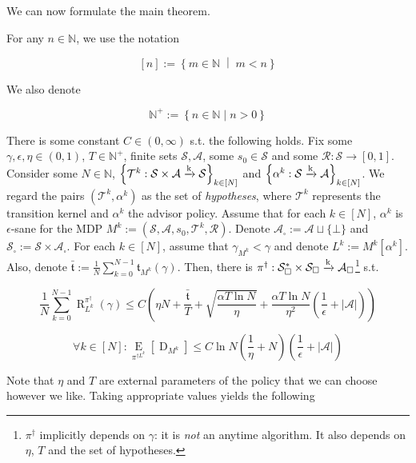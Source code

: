 \documentclass[anon,12pt]{colt2018} %
\newcommand{\AP}[1]{\left(#1\right)}
\newcommand{\AB}[1]{\left[#1\right]}
\newcommand{\AC}[1]{\left\{#1\right\}}
\newcommand{\ACM}[2]{\left\{#1\;\middle\vert\;#2\right\}}
\newcommand{\Ea}[2]{\underset{#1}{\operatorname{E}}\AB{#2}}
\newcommand{\Nats}{\mathbb{N}}
\newcommand{\Abs}[1]{\left\vert #1 \right\vert}
\newcommand{\K}{\xrightarrow{\textnormal{k}}}
\newcommand{\A}{\mathcal{A}}
\newcommand{\St}{\mathcal{S}}
\newcommand{\T}{\mathcal{T}}
\newcommand{\R}{\mathcal{R}}
\newcommand{\Rg}{\operatorname{R}}
\newcommand{\Tn}{\mathfrak{t}}
\newcommand{\Ad}{\alpha}
\newcommand{\ND}{\operatorname{D}}
\begin{document}
We can now formulate the main theorem.

For any $n \in \Nats$, we use the notation 

\[[n]:=\ACM{m\in\Nats}{m < n}\] 

We also denote 

\[\Nats^+:=\AC{n \in \Nats \mid n > 0}\]

\begin{samepage}
\begin{theorem}
\label{thm:regret_bound}

There is some constant $C \in (0,\infty)$ s.t. the following holds. Fix some $\gamma,\epsilon,\eta \in (0,1)$, $T\in\Nats^+$, finite sets $\St,\A$, some $s_0 \in \St$ and some $\R: \St \rightarrow [0,1]$. Consider some $N \in \Nats$, $\AC{\T^k: \St \times \A \K \St}_{k\in[N]}$ and $\AC{\Ad^k :\St \K \A}_{k\in[N]}$. We regard the pairs $(\T^k,\Ad^k)$ as the set of \emph{hypotheses}, where $\T^k$ represents the transition kernel and $\Ad^k$ the advisor policy. Assume that for each $k\in[N]$, $\Ad^k$ is $\epsilon$-sane for the MDP $M^k:=\AP{\St,\A,s_0,\T^k,\R}$. Denote $\A_\square:=\A\sqcup\{\bot\}$ and $\St_\square:=\St \times \A_\square$. For each $k \in [N]$, assume that $\gamma_{M^k} < \gamma$ and denote $L^k:=M^k\AB{\Ad^k}$. Also, denote $\bar{\Tn}:=\frac{1}{N}\sum_{k=0}^{N-1} \Tn_{M^k}(\gamma)$. Then, there is $\pi^\dagger: \St_\square^* \times \St_\square \K \A_\square$\footnote{$\pi^\dagger$ implicitly depends on $\gamma$: it is \emph{not} an anytime algorithm. It also depends on $\eta$, $T$ and the set of hypotheses.} s.t.

\begin{equation}
\label{eqn:thm__regret_bound__regret}
\frac{1}{N}\sum_{k=0}^{N-1}\Rg_{L^k}^{\pi^\dagger}(\gamma) \leq C\AP{\eta N+\frac{\bar{\Tn}}{T}+\sqrt{\frac{\alpha T \ln{N}}{\eta}}+\frac{\alpha T \ln{N}}{\eta^2}\AP{\frac{1}{\epsilon}+\Abs{\A}}}
\end{equation}

\begin{equation}
\label{eqn:thm__regret_bound__delegations}
\forall k\in[N]:\Ea{\pi^{\dagger L^k}}{\ND_{M^k}} \leq C\ln{N}\AP{\frac{1}{\eta}+N}\AP{\frac{1}{\epsilon}+\Abs{\A}}
\end{equation}

\end{theorem}
\end{samepage}

Note that $\eta$ and $T$ are external parameters of the policy that we can choose however we like. Taking appropriate values yields the following
\end{document}
